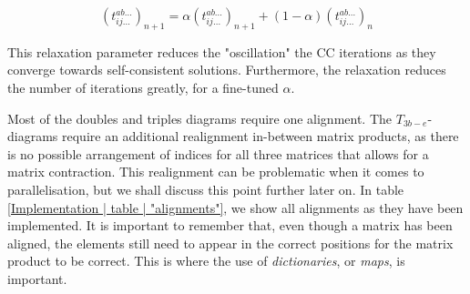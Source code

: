 	\begin{equation}
		(t_{ij\ldots}^{ab\ldots})_{n+1} = \alpha(t_{ij\ldots}^{ab\ldots})_{n+1} + (1-\alpha)(t_{ij\ldots}^{ab\ldots})_{n}
	\end{equation}
	
	This relaxation parameter reduces the "oscillation" the CC iterations as they converge towards self-consistent solutions. Furthermore, the relaxation reduces the number of iterations greatly, for a fine-tuned $\alpha$.
	
	
	Most of the doubles and triples diagrams require one alignment. The $T_{3b-e}$-diagrams require an additional realignment in-between matrix products, as there is no possible arrangement of indices for all three matrices that allows for a matrix contraction. This realignment can be problematic when it comes to parallelisation, but we shall discuss this point further later on. In table \ref{Implementation | table | "alignments"}, we show all alignments as they have been implemented. It is important to remember that, even though a matrix has been aligned, the elements still need to appear in the correct positions for the matrix product to be correct. This is where the use of \emph{dictionaries}, or \emph{maps}, is important.\\
	
